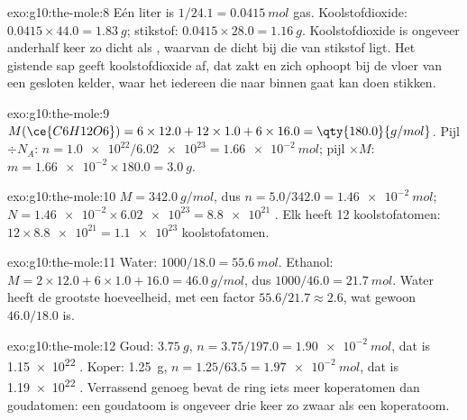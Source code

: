 \begin{solution}{exo:g10:the-mole:8}
Eén liter is $1/24.1 = \qty{0.0415}{mol}$ gas. Koolstofdioxide:
$0.0415 \times 44.0 = \qty{1.83}{g}$; stikstof:
$0.0415 \times 28.0 = \qty{1.16}{g}$. Koolstofdioxide is ongeveer
anderhalf keer zo dicht als , waarvan de  dicht bij die
van stikstof ligt. Het gistende sap geeft koolstofdioxide af, dat zakt en
zich ophoopt bij de vloer van een gesloten kelder, waar het iedereen die
naar binnen gaat kan doen stikken.
\end{solution}

\begin{solution}{exo:g10:the-mole:9}
$M(\ce{C6H12O6}) = 6 \times 12.0 + 12 \times 1.0 + 6 \times 16.0 =
\qty{180.0}{g/mol}$. Pijl $\div N_A$: $n = \num{1.0e22} / \num{6.02e23} =
\qty{1.66e-2}{mol}$; pijl $\times M$: $m = \num{1.66e-2} \times 180.0 =
\qty{3.0}{g}$.
\end{solution}

\begin{solution}{exo:g10:the-mole:10}
$M = \qty{342.0}{g/mol}$, dus $n = 5.0 / 342.0 = \qty{1.46e-2}{mol}$;
$N = \num{1.46e-2} \times \num{6.02e23} = \num{8.8e21}$ . Elk
heeft 12 koolstofatomen: $12 \times \num{8.8e21} = \num{1.1e23}$
koolstofatomen.
\end{solution}

\begin{solution}{exo:g10:the-mole:11}
Water: $1000 / 18.0 = \qty{55.6}{mol}$. Ethanol:
$M = 2 \times 12.0 + 6 \times 1.0 + 16.0 = \qty{46.0}{g/mol}$, dus
$1000 / 46.0 = \qty{21.7}{mol}$. Water heeft de grootste hoeveelheid, met
een factor $55.6 / 21.7 \approx 2.6$, wat gewoon $46.0 / 18.0$ is.
\end{solution}

\begin{solution}{exo:g10:the-mole:12}
Goud: $\qty{3.75}{g}$, $n = 3.75 / 197.0 = \qty{1.90e-2}{mol}$, dat is
\num{1.15e22} . Koper: \qty{1.25}{g},
$n = 1.25 / 63.5 = \qty{1.97e-2}{mol}$, dat is \num{1.19e22} .
Verrassend genoeg bevat de ring iets meer koperatomen dan goudatomen: een
goudatoom is ongeveer drie keer zo zwaar als een koperatoom.
\end{solution}

